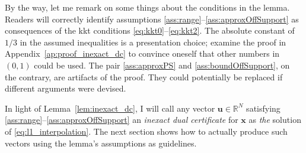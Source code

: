 By the way, let me remark on some things about the conditions in the lemma. Readers will correctly identify assumptions \ref{ass:range}--\ref{ass:approxOffSupport} as consequences of the \acrshort{kkt} conditions \ref{eq:kkt0}--\ref{eq:kkt2}. The absolute constant of $1/3$ in the assumed inequalities is a presentation choice; examine the proof in Appendix~\ref{ap:proof_inexact_dc} to convince oneself that other numbers in $(0,1)$ could be used. The pair \ref{ass:approxPS} and \ref{ass:boundOffSupport}, on the contrary, are artifacts of the proof. They could potentially be replaced if different arguments were devised.

In light of Lemma~\ref{lem:inexact_dc}, I will call any vector $\mathbf{u} \in \mathbb{R}^{N}$ satisfying \ref{ass:range}--\ref{ass:approxOffSupport} an \emph{inexact dual certificate} for $\mathbf{x}$ as \emph{the} solution of \ref{eq:l1_interpolation}. The next section shows how to actually produce such vectors using the lemma's assumptions as guidelines.
